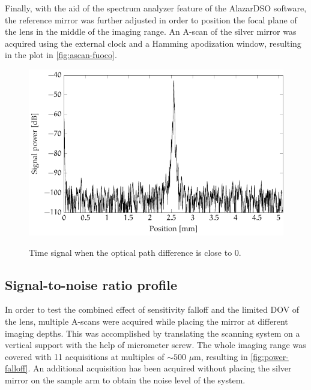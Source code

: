 Finally, with the aid of the spectrum analyzer feature of the AlazarDSO software, the reference mirror was further adjusted in order to position the focal plane of the lens in the middle of the imaging range. An A-scan of the silver mirror was acquired using the external clock and a Hamming apodization window, resulting in the plot in \autoref{fig:ascan-fuoco}.

\begin{figure}[hbt]
	\myfloatalign
	{	\includegraphics[width=\linewidth]{gfx/ch3/fuoco}}
	\caption{Time signal when the optical path difference is close to 0.}\label{fig:ascan-fuoco}
\end{figure}


\subsection{Signal-to-noise ratio profile}
In order to test the combined effect of sensitivity falloff and the limited DOV of the lens, multiple A-scans were acquired while placing the mirror at different imaging depths. This was accomplished by translating the scanning system on a vertical support with the help of micrometer screw. The whole imaging range was covered with 11 acquisitions at multiples of $\sim 500$ $\mu$m, resulting in \autoref{fig:power-falloff}. An additional acquisition has been acquired without placing the silver mirror on the sample arm to obtain the noise level of the system. 


